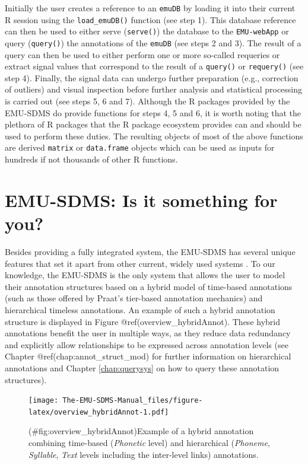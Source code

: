 \documentclass[]{book}
\theoremstyle{definition}
\theoremstyle{definition}
\theoremstyle{definition}
\theoremstyle{remark}
\begin{document}
Initially the user creates a reference to an \texttt{emuDB} by loading
it into their current R session using the \texttt{load\_emuDB()}
function (see step 1). This database reference can then be used to
either serve (\texttt{serve()}) the database to the \texttt{EMU-webApp}
or query (\texttt{query()}) the annotations of the \texttt{emuDB} (see
steps 2 and 3). The result of a query can then be used to either perform
one or more so-called requeries or extract signal values that correspond
to the result of a \texttt{query()} or \texttt{requery()} (see step 4).
Finally, the signal data can undergo further preparation (e.g.,
correction of outliers) and visual inspection before further analysis
and statistical processing is carried out (see steps 5, 6 and 7).
Although the R packages provided by the EMU-SDMS do provide functions
for steps 4, 5 and 6, it is worth noting that the plethora of R packages
that the R package ecosystem provides can and should be used to perform
these duties. The resulting objects of most of the above functions are
derived \texttt{matrix} or \texttt{data.frame} objects which can be used
as inputs for hundreds if not thousands of other R functions.

\section{EMU-SDMS: Is it something for
you?}\label{emu-sdms-is-it-something-for-you}

\label{sec:overview_unique}

Besides providing a fully integrated system, the EMU-SDMS has several
unique features that set it apart from other current, widely used
systems \citep[e.g.,][\citet{wittenburg:2006a}, \citet{fromont:2012a},
\citet{rose:2006a}, \citet{mcauliffe:2016a}]{boersma:2011a}. To our
knowledge, the EMU-SDMS is the only system that allows the user to model
their annotation structures based on a hybrid model of time-based
annotations (such as those offered by Praat's tier-based annotation
mechanics) and hierarchical timeless annotations. An example of such a
hybrid annotation structure is displayed in Figure
@ref(overview\_hybridAnnot). These hybrid annotations benefit the user
in multiple ways, as they reduce data redundancy and explicitly allow
relationships to be expressed across annotation levels (see Chapter
@ref(chap:annot\_struct\_mod) for further information on hierarchical
annotations and Chapter \ref{chap:querysys} on how to query these
annotation structures).

\begin{figure}
\centering
\texttt{[image: The-EMU-SDMS-Manual\_files/figure-latex/overview\_hybridAnnot-1.pdf]}
\caption{(\#fig:overview\_hybridAnnot)Example of a hybrid annotation
combining time-based (\emph{Phonetic} level) and hierarchical
(\emph{Phoneme}, \emph{Syllable}, \emph{Text} levels including the
inter-level links) annotations.}
\end{figure}
\end{document}

